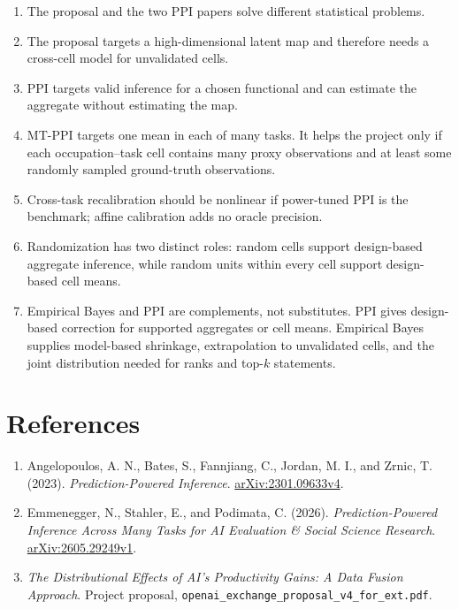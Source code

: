 \documentclass[11pt]{article}
\begin{document}
  \begin{enumerate}[leftmargin=2em]
      \item The proposal and the two PPI papers solve different statistical
      problems.
      \item The proposal targets a high-dimensional latent map and therefore
      needs a cross-cell model for unvalidated cells.
      \item PPI targets valid inference for a chosen functional and can estimate
      the aggregate without estimating the map.
      \item MT-PPI targets one mean in each of many tasks. It helps the project
      only if each occupation--task cell contains many proxy observations and
      at least some randomly sampled ground-truth observations.
      \item Cross-task recalibration should be nonlinear if power-tuned PPI is
      the benchmark; affine calibration adds no oracle precision.
      \item Randomization has two distinct roles:
      random cells support design-based aggregate inference, while random units
      within every cell support design-based cell means.
      \item Empirical Bayes and PPI are complements, not substitutes. PPI gives
      design-based correction for supported aggregates or cell means. Empirical
      Bayes supplies model-based shrinkage, extrapolation to unvalidated cells,
      and the joint distribution needed for ranks and top-\(k\) statements.
  \end{enumerate}
  
  \section*{References}
  
  \begin{enumerate}[leftmargin=2em]
      \item Angelopoulos, A. N., Bates, S., Fannjiang, C., Jordan, M. I., and
      Zrnic, T. (2023). \emph{Prediction-Powered Inference}.
      \href{https://arxiv.org/pdf/2301.09633}{arXiv:2301.09633v4}.
      \item Emmenegger, N., Stahler, E., and Podimata, C. (2026).
      \emph{Prediction-Powered Inference Across Many Tasks for AI Evaluation
      \& Social Science Research}.
      \href{https://arxiv.org/pdf/2605.29249}{arXiv:2605.29249v1}.
      \item \emph{The Distributional Effects of AI's Productivity Gains:
      A Data Fusion Approach}. Project proposal,
      \texttt{openai\_exchange\_proposal\_v4\_for\_ext.pdf}.
  \end{enumerate}
  
  
\end{document}
